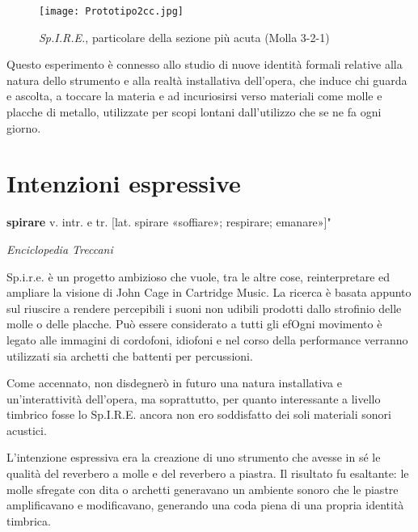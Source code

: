 \begin{figure}[htbp]
\begin{center}
\texttt{[image: Prototipo2cc.jpg]}
\caption{\textit{Sp.I.R.E.}, particolare della sezione più acuta (Molla 3-2-1)}
\label{default}
\end{center}
\end{figure}

Questo esperimento è connesso allo studio di nuove identità formali relative alla natura dello strumento e alla realtà installativa dell'opera, che induce chi guarda e ascolta, a toccare la materia e ad incuriosirsi verso materiali come molle e placche di metallo, utilizzate per scopi lontani dall'utilizzo che se ne fa ogni giorno.

\section{Intenzioni espressive}

\epigraph{\textbf{spirare} v. intr. e tr. [lat. spirare «soffiare»; respirare; emanare»]"}
{\textit{Enciclopedia Treccani}}

Sp.i.r.e. è un progetto ambizioso che vuole, tra le altre cose, reinterpretare ed ampliare la visione di John Cage in Cartridge Music. La ricerca è basata appunto sul riuscire a rendere percepibili i suoni non udibili prodotti dallo strofinio delle molle o delle placche. Può essere considerato a tutti gli efOgni movimento è legato alle immagini di cordofoni, idiofoni e nel corso della performance verranno utilizzati sia archetti che battenti per percussioni.

Come accennato, non disdegnerò in futuro una natura installativa e un'interattività dell'opera, ma soprattutto, per quanto interessante a livello timbrico fosse lo Sp.I.R.E. ancora non ero soddisfatto dei soli materiali sonori acustici.


L'intenzione espressiva era la creazione di uno strumento che avesse in sé le qualità del reverbero a molle e del reverbero a piastra. Il risultato fu esaltante: le molle sfregate con dita o archetti generavano un ambiente sonoro che le piastre amplificavano e modificavano, generando una coda piena di una propria identità timbrica.



